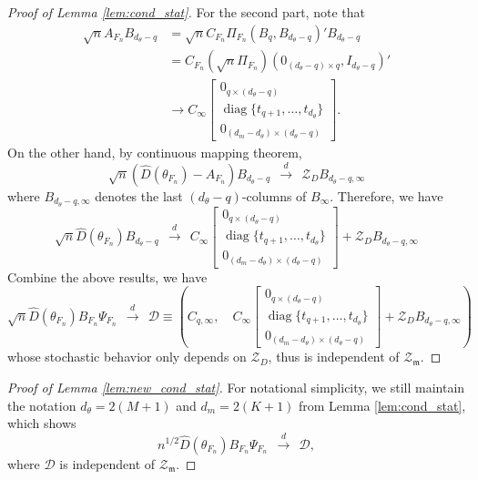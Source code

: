 \documentclass[11pt]{article}
\theoremstyle{definition}
\DeclareMathOperator*{\diag}{diag}
\newcommand{\0}{\ensuremath{\mathbf{0}}}
\begin{document}
\begin{bibunit}
\begin{proof}[Proof of Lemma \ref{lem:cond_stat}]
	For the second part, note that 
	\begin{align*}
		\sqrt{n} A_{F_n} B_{d_\theta - q} 
		&= 
		\sqrt{n} C_{F_n} \Pi_{F_n} (B_q, B_{d_\theta - q})' B_{d_\theta - q} \\
		&=
		C_{F_n} (\sqrt{n}\Pi_{F_n}) (0_{(d_\theta - q)\times q}, I_{d_\theta - q})' \\
		&\to
		C_\infty
		\begin{bmatrix}
			0_{q\times(d_\theta - q)} \\
			\diag\{t_{q+1}, \ldots, t_{d_\theta}\} \\
			0_{(d_m-d_\theta)\times (d_\theta - q) }
		\end{bmatrix}.
	\end{align*}
	On the other hand, by continuous mapping theorem,
	\[
		\sqrt{n} (\hat{D}(\theta_{F_n}) - A_{F_n}) B_{d_\theta - q} ~~\xrightarrow{d}~~ \mathcal{Z}_D
		B_{d_\theta - q, \infty}
	\]
	where $B_{d_\theta-q,\infty}$ denotes the last $(d_\theta - q)$-columns of $B_\infty$.
	Therefore, we have
	\[
		\sqrt{n}\hat{D}(\theta_{F_n})B_{d_\theta - q} ~~\xrightarrow{d}~~ C_\infty 
		\begin{bmatrix}
			0_{q\times(d_\theta - q)} \\
			\diag\{t_{q+1}, \ldots, t_{d_\theta}\} \\
			0_{(d_m-d_\theta)\times (d_\theta - q) }
		\end{bmatrix} 
		+
		\mathcal{Z}_D
		B_{d_\theta - q, \infty}
	\]
	Combine the above results, we have 
	\[
		\sqrt{n}\hat{D}(\theta_{F_n})B_{F_n}\Psi_{F_n} ~~\xrightarrow{d}~~ \mathcal{D} \equiv \left(C_{q,\infty}, \quad C_\infty 
		\begin{bmatrix}
			0_{q\times(d_\theta - q)} \\
			\diag\{t_{q+1}, \ldots, t_{d_\theta}\} \\
			0_{(d_m-d_\theta)\times (d_\theta - q) }
		\end{bmatrix} 
		+
		\mathcal{Z}_D
		B_{d_\theta - q, \infty}\right) 
	\]
	whose stochastic behavior only depends on $\mathcal{Z}_D$, thus is independent of $\mathcal{Z}_{\mathfrak{m}}$.
\end{proof}



\bigskip


%
\begin{proof}[Proof of Lemma \ref{lem:new_cond_stat}]
	For notational simplicity, we still maintain the notation $d_\theta = 2(M+1)$ and $d_m = 2(K+1)$ from Lemma \ref{lem:cond_stat}, which shows  
	\[
		n^{1/2} \hat{D}(\theta_{F_n}) B_{F_n} \Psi_{F_n} ~~\xrightarrow{d}~~ \mathcal{D},	
	\]
	where $\mathcal{D}$ is independent of $\mathcal{Z}_{\mathfrak{m}}$.


\end{proof}
\end{bibunit}
\end{document}
